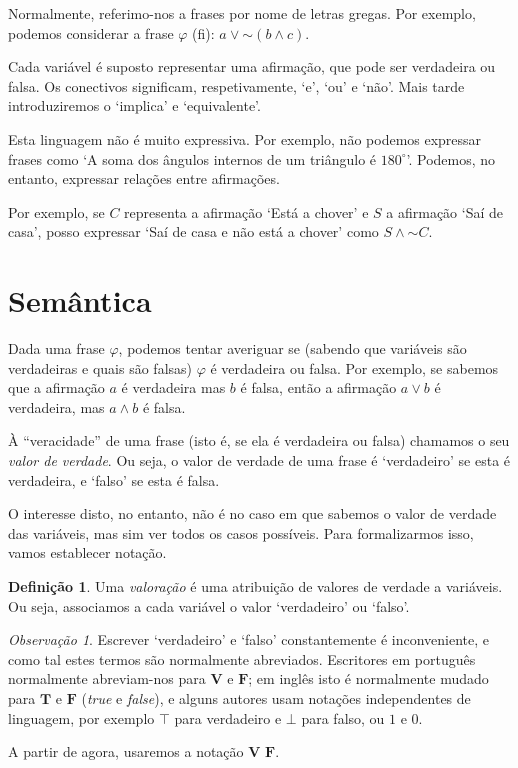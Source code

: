 \documentclass{article}
\theoremstyle{definition}
\newtheorem{definicao}{Definição}
\theoremstyle{remark}
\newtheorem{obs}{Observação}
\newcommand{\V}{\mathbf{V}}
\newcommand{\F}{\mathbf{F}}
\newcommand*{\lneg}{\mathord{\sim}}
\begin{document}
	Normalmente, referimo-nos a frases por nome de letras gregas. Por exemplo, podemos considerar a frase $\varphi$ (fi): $a \lor \lneg(b \land c)$.
	
	Cada variável é suposto representar uma afirmação, que pode ser verdadeira ou falsa. Os conectivos significam, respetivamente, `e', `ou' e `não'. Mais tarde introduziremos o `implica' e `equivalente'.
	
	Esta linguagem não é muito expressiva. Por exemplo, não podemos expressar frases como `A soma dos ângulos internos de um triângulo é $180^\circ$'. Podemos, no entanto, expressar relações entre afirmações.
	
	Por exemplo, se $C$ representa a afirmação `Está a chover' e $S$ a afirmação `Saí de casa', posso expressar `Saí de casa e não está a chover' como $S \land \lneg C$.
	
	\section{Semântica}
	
	Dada uma frase $\varphi$, podemos tentar averiguar se (sabendo que variáveis são verdadeiras e quais são falsas) $\varphi$ é verdadeira ou falsa. Por exemplo, se sabemos que a afirmação $a$ é verdadeira mas $b$ é falsa, então a afirmação $a \lor b$ é verdadeira, mas $a \land b$ é falsa.
	
	À ``veracidade'' de uma frase (isto é, se ela é verdadeira ou falsa) chamamos o seu \emph{valor de verdade}. Ou seja, o valor de verdade de uma frase é `verdadeiro' se esta é verdadeira, e `falso' se esta é falsa.
	
	O interesse disto, no entanto, não é no caso em que sabemos o valor de verdade das variáveis, mas sim ver todos os casos possíveis. Para formalizarmos isso, vamos establecer notação.
	
	\begin{definicao}
	Uma \emph{valoração} é uma atribuição de valores de verdade a variáveis. Ou seja, associamos a cada variável o valor `verdadeiro' ou `falso'.
	\end{definicao}
	
	\begin{obs}
	Escrever `verdadeiro' e `falso' constantemente é inconveniente, e como tal estes termos são normalmente abreviados. Escritores em português normalmente abreviam-nos para $\V$ e $\F$; em inglês isto é normalmente mudado para $\mathbf{T}$ e $\mathbf{F}$ (\textit{true} e \textit{false}), e alguns autores usam notações independentes de linguagem, por exemplo $\top$ para verdadeiro e $\bot$ para falso, ou $1$ e $0$.
	
	A partir de agora, usaremos a notação $\V$ $\F$.
	\end{obs}
	
\end{document}
